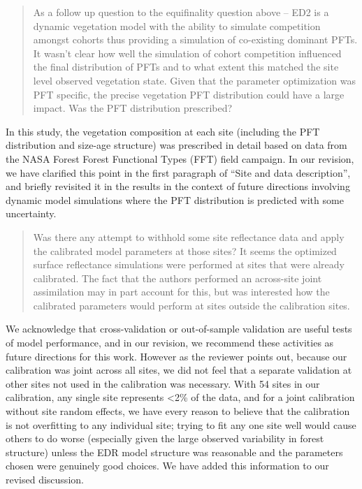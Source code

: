 
\begin{quote}
  As a follow up question to the equifinality question above – ED2 is a dynamic vegetation model with the ability to simulate competition amongst cohorts thus providing a simulation of co-existing dominant PFTs. It wasn’t clear how well the simulation of cohort competition influenced the final distribution of PFTs and to what extent this matched the site level observed vegetation state. Given that the parameter optimization was PFT specific, the precise vegetation PFT distribution could have a large impact. Was the PFT distribution prescribed?
\end{quote}

In this study, the vegetation composition at each site (including the PFT distribution and size-age structure) was prescribed in detail based on data from the NASA Forest Forest Functional Types (FFT) field campaign. In our revision, we have clarified this point in the first paragraph of “Site and data description”, and briefly revisited it in the results in the context of future directions involving dynamic model simulations where the PFT distribution is predicted with some uncertainty.


\begin{quote}
  Was there any attempt to withhold some site reflectance data and apply the calibrated model parameters at those sites? It seems the optimized surface reflectance simulations were performed at sites that were already calibrated. The fact that the authors performed an across-site joint assimilation may in part account for this, but was interested how the calibrated parameters would perform at sites outside the calibration sites.
\end{quote}

We acknowledge that cross-validation or out-of-sample validation are useful tests of model performance, and in our revision, we recommend these activities as future directions for this work. However as the reviewer points out, because our calibration was joint across all sites, we did not feel that a separate validation at other sites not used in the calibration was necessary. With 54 sites in our calibration, any single site represents <2\% of the data, and for a joint calibration without site random effects, we have every reason to believe that the calibration is not overfitting to any individual site; trying to fit any one site well would cause others to do worse (especially given the large observed variability in forest structure) unless the EDR model structure was reasonable and the parameters chosen were genuinely good choices. We have added this information to our revised discussion.

